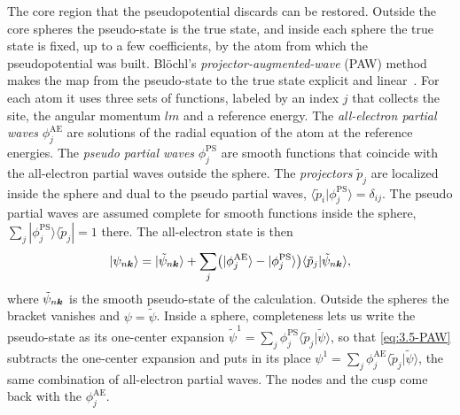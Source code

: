 The core region that the pseudopotential discards can be restored. Outside the core spheres the pseudo-state is the true state, and inside each sphere the true state is fixed, up to a few coefficients, by the atom from which the pseudopotential was built. Bl\"ochl's \emph{projector-augmented-wave} (PAW) method makes the map from the pseudo-state to the true state explicit and linear~\cite{blochl1994projector}. For each atom it uses three sets of functions, labeled by an index $j$ that collects the site, the angular momentum $lm$ and a reference energy. The \emph{all-electron partial waves} $\phi^{\mathrm{AE}}_j$ are solutions of the radial equation of the atom at the reference energies. The \emph{pseudo partial waves} $\phi^{\mathrm{PS}}_j$ are smooth functions that coincide with the all-electron partial waves outside the sphere. The \emph{projectors} $\tilde p_j$ are localized inside the sphere and dual to the pseudo partial waves, $\langle\tilde p_i|\phi^{\mathrm{PS}}_j\rangle = \delta_{ij}$. The pseudo partial waves are assumed complete for smooth functions inside the sphere, $\sum_j|\phi^{\mathrm{PS}}_j\rangle\langle\tilde p_j| = 1$ there. The all-electron state is then
\begin{equation}
  |\psi_{n\bm{k}}\rangle = |\tilde\psi_{n\bm{k}}\rangle + \sum_j\bigl(|\phi^{\mathrm{AE}}_j\rangle - |\phi^{\mathrm{PS}}_j\rangle\bigr)\langle\tilde p_j|\tilde\psi_{n\bm{k}}\rangle ,
  \label{eq:3.5-PAW}
\end{equation}
where $\tilde\psi_{n\bm{k}}$ is the smooth pseudo-state of the calculation. Outside the spheres the bracket vanishes and $\psi = \tilde\psi$. Inside a sphere, completeness lets us write the pseudo-state as its one-center expansion $\tilde\psi^1 = \sum_j\phi^{\mathrm{PS}}_j\langle\tilde p_j|\tilde\psi\rangle$, so that \cref{eq:3.5-PAW} subtracts the one-center expansion and puts in its place $\psi^1 = \sum_j\phi^{\mathrm{AE}}_j\langle\tilde p_j|\tilde\psi\rangle$, the same combination of all-electron partial waves. The nodes and the cusp come back with the $\phi^{\mathrm{AE}}_j$.

